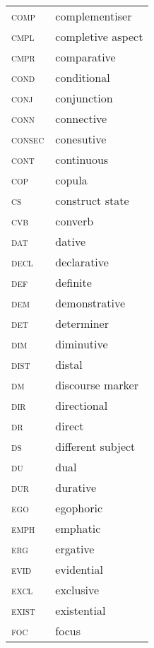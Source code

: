 \begin{multicols}{2}
\begin{tabular}{lp{4cm}@{}}
\textsc{comp}&complementiser\\
\textsc{cmpl}&completive aspect\\
\textsc{cmpr}&comparative\\
\textsc{cond}&conditional\\
\textsc{conj}&conjunction\\
\textsc{conn}&connective\\
\textsc{consec}&conesutive\\
\textsc{cont}&continuous\\
\textsc{cop}&copula\\
\textsc{cs}&construct state\\
\textsc{cvb}&converb\\
\textsc{dat}&dative\\
\textsc{decl} & declarative\\
\textsc{def}&definite\\
\textsc{dem}&demonstrative\\
\textsc{det}&determiner\\
\textsc{dim}&diminutive\\
\textsc{dist}&distal\\
\textsc{dm}&discourse marker\\
\textsc{dir}&directional\\
\textsc{dr}&direct\\
\textsc{ds}&different subject\\
\textsc{du}&dual\\
\textsc{dur}&durative\\
\textsc{ego}&egophoric\\
\textsc{emph}&emphatic\\
\textsc{erg}&ergative\\
\textsc{evid}&evidential\\
\textsc{excl}&exclusive\\
\textsc{exist}&existential\\
\textsc{foc}&focus\\
\end{tabular}



\end{multicols}

